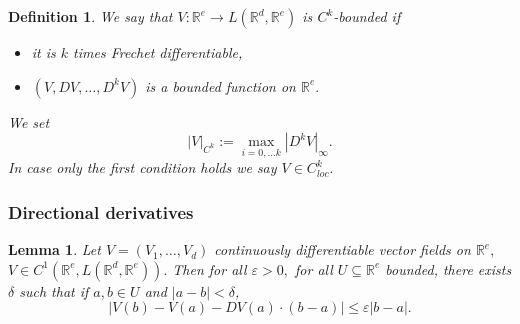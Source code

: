 \documentclass{article}
\newcommand{\R}{\mathbb{R}}
\newtheorem{definition}{Definition}
\newtheorem{lemma}[theorem]{Lemma}
\begin{document}
\begin{definition}
    We say that $V: \R^e \rightarrow L(\R^d, \R^e)$ is $C^k$-bounded if
    \begin{itemize}
        \item it is $k$ times Frechet differentiable,
        \item $(V, DV, \ldots, D^k V)$ is a bounded function on $\R^e.$
    \end{itemize}
    We set
    \begin{equation}
        |V|_{C^k} := \max_{i=0, \ldots k} |D^k V|_\infty.
    \end{equation}
    In case only the first condition holds we say $V \in C^k_{loc}.$
\end{definition}

\subsubsection{Directional derivatives}

\begin{lemma}
    Let $V = (V_1, \ldots, V_d)$ continuously differentiable vector fields on $\R^e,$ $V \in C^1(\R^e, L(\R^d,\R^e)).$
    Then for all $\varepsilon > 0,$ for all $U \subseteq \R^e$ bounded, there exists $\delta$ such that if $a,b \in U$ and $|a-b|<\delta$, 
    \begin{equation}
        |V(b) - V(a) - DV(a) \cdot (b - a)| \leq \varepsilon |b - a|. 
    \end{equation}
\end{lemma}
\end{document}

